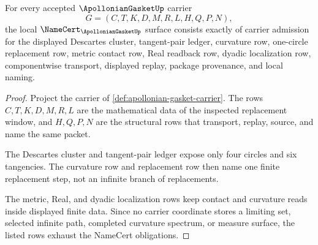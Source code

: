 \begin{theorem}
\label{thm:apollonian-gasket-namecert-obligations}
For every accepted $\ApollonianGasketUp$ carrier
$$
G=(C,T,K,D,M,R,L,H,Q,P,N),
$$
the local $\NameCert_{\ApollonianGasketUp}$ surface consists exactly of carrier admission for the displayed Descartes cluster, tangent-pair ledger, curvature row, one-circle replacement row, metric contact row, Real readback row, dyadic localization row, componentwise transport, displayed replay, package provenance, and local naming.
\end{theorem}
\begin{proof}
Project the carrier of \autoref{def:apollonian-gasket-carrier}. The rows $C,T,K,D,M,R,L$ are the mathematical data of the inspected replacement window, and $H,Q,P,N$ are the structural rows that transport, replay, source, and name the same packet.

The Descartes cluster and tangent-pair ledger expose only four circles and six tangencies. The curvature row and replacement row then name one finite replacement step, not an infinite branch of replacements.

The metric, Real, and dyadic localization rows keep contact and curvature reads inside displayed finite data. Since no carrier coordinate stores a limiting set, selected infinite path, completed curvature spectrum, or measure surface, the listed rows exhaust the NameCert obligations.
\end{proof}

